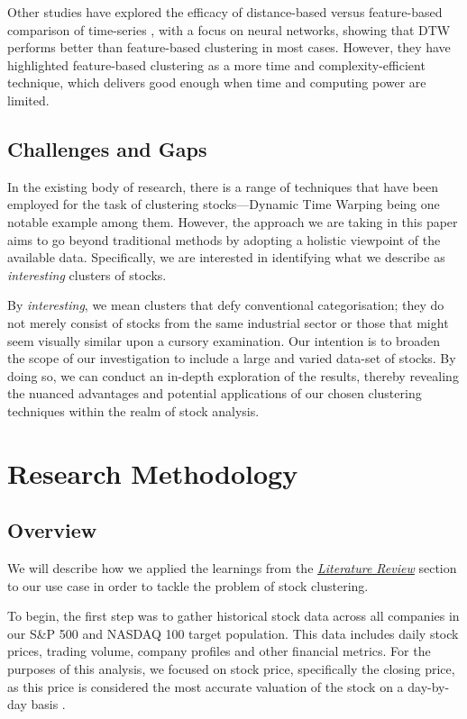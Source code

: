 \documentclass[11pt]{article}
\begin{document}
Other studies have explored the efficacy of distance-based versus feature-based comparison of time-series \cite{ref1}, with a focus on neural networks, showing that DTW performs better than feature-based clustering in most cases. However, they have highlighted feature-based clustering as a more time and complexity-efficient technique, which delivers good enough when time and computing power are limited.


\subsection{Challenges and Gaps}


In the existing body of research, there is a range of techniques that have been employed for the task of clustering stocks—Dynamic Time Warping being one notable example among them. However, the approach we are taking in this paper aims to go beyond traditional methods by adopting a holistic viewpoint of the available data. Specifically, we are interested in identifying what we describe as \textit{interesting} clusters of stocks.

By \textit{interesting}, we mean clusters that defy conventional categorisation; they do not merely consist of stocks from the same industrial sector or those that might seem visually similar upon a cursory examination. Our intention is to broaden the scope of our investigation to include a large and varied data-set of stocks. By doing so, we can conduct an in-depth exploration of the results, thereby revealing the nuanced advantages and potential applications of our chosen clustering techniques within the realm of stock analysis.

\section{Research Methodology}

\subsection{Overview}
We will describe how we applied the learnings from the \textit{\hyperref[sec:literature_review]{Literature Review}} section to our use case in order to tackle the problem of stock clustering.

To begin, the first step was to gather historical stock data across all companies in our S\&P 500 and NASDAQ 100 target population. This data includes daily stock prices, trading volume, company profiles and other financial metrics. For the purposes of this analysis, we focused on stock price, specifically the closing price, as this price is considered the most accurate valuation of the stock on a day-by-day basis \cite{closePrice}.
\end{document}
